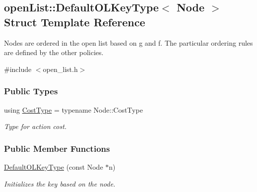 \hypertarget{structopenList_1_1DefaultOLKeyType}{}\subsection{open\+List\+:\+:Default\+O\+L\+Key\+Type$<$ Node $>$ Struct Template Reference}
\label{structopenList_1_1DefaultOLKeyType}


Nodes are ordered in the open list based on g and f. The particular ordering rules are defined by the other policies.  




{\ttfamily \#include $<$open\+\_\+list.\+h$>$}

\subsubsection*{Public Types}
\begin{DoxyCompactItemize}
\item 
using \hyperlink{structopenList_1_1DefaultOLKeyType_a7ae24eab1885ae1231f6245db9f88897}{Cost\+Type} = typename Node\+::\+Cost\+Type\hypertarget{structopenList_1_1DefaultOLKeyType_a7ae24eab1885ae1231f6245db9f88897}{}\label{structopenList_1_1DefaultOLKeyType_a7ae24eab1885ae1231f6245db9f88897}

\begin{DoxyCompactList}\small\item\em Type for action cost. \end{DoxyCompactList}\end{DoxyCompactItemize}
\subsubsection*{Public Member Functions}
\begin{DoxyCompactItemize}
\item 
\hyperlink{structopenList_1_1DefaultOLKeyType_ab204fcbe8f3d3f696988be4387849251}{Default\+O\+L\+Key\+Type} (const Node $\ast$n)
\begin{DoxyCompactList}\small\item\em Initializes the key based on the node. \end{DoxyCompactList}\end{DoxyCompactItemize}
